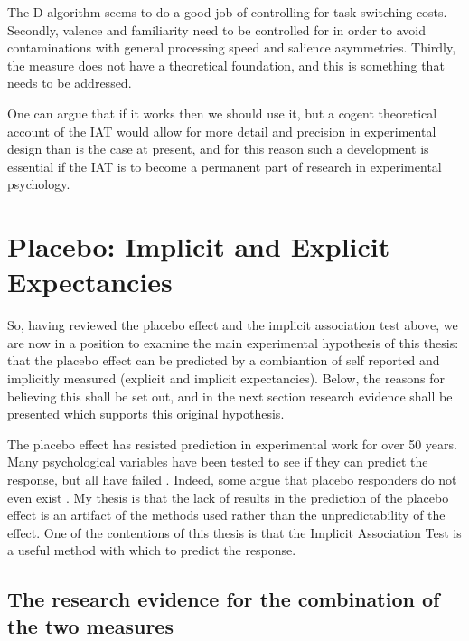 The D algorithm seems to do a good job of controlling for task-switching costs. Secondly, valence and familiarity need to be controlled for in order to avoid contaminations with general processing speed and salience asymmetries. Thirdly, the measure does not have a theoretical foundation, and this is something that needs to be addressed. 

One can argue that if it works then we should use it, but a cogent theoretical account of the IAT would allow for more detail and precision in experimental design  than is the case at present, and for this reason such a development is essential if the IAT is to become a permanent part of research in experimental psychology.



\section{Placebo: Implicit and Explicit Expectancies}
\label{sec:measurement-placebo}




So, having reviewed the placebo effect and the implicit association test above, we are now in a position to examine the main experimental hypothesis of this thesis: that the placebo effect can be predicted by a combiantion of self reported and implicitly measured (explicit and implicit expectancies). Below, the reasons for believing this shall be set out, and in the next section  research evidence shall be presented which supports this original hypothesis. 

The placebo effect has resisted prediction in experimental work for over 50 years. Many psychological variables have been tested to see if they can predict the response, but all have failed \cite{Shapiro1997}. Indeed, some argue that placebo responders do not even exist \cite{Kaptchuk2008a}. My thesis is that the lack of results in the prediction of the placebo effect is an artifact of the methods used rather than the unpredictability of the effect. One of the contentions of this thesis is that the Implicit Association Test is a useful method with which to predict the response. 


\subsection{The research evidence for the combination of the two measures}
\label{sec:rese-base-comb}

